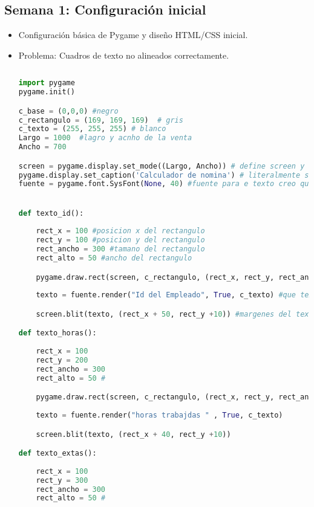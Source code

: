\documentclass[a4paper,12pt]{article}
\begin{document}
\subsection*{Semana 1: Configuración inicial}
\begin{itemize}
    \item Configuración básica de Pygame y diseño HTML/CSS inicial.
    \item Problema: Cuadros de texto no alineados correctamente.
    \begin{lstlisting}[language=Python]
    
import pygame
pygame.init()

c_base = (0,0,0) #negro
c_rectangulo = (169, 169, 169)  # gris
c_texto = (255, 255, 255) # blanco
Largo = 1000  #lagro y acnho de la venta
Ancho = 700

screen = pygame.display.set_mode((Largo, Ancho)) # define screen y ademas define el largo y anho de la ventana
pygame.display.set_caption('Calculador de nomina') # literalmente solo nombra la ventaa xd\
fuente = pygame.font.SysFont(None, 40) #fuente para e texto creo que es arial segun reddit no lo es pero no onfio en esos locos]


def texto_id():
    
    rect_x = 100 #posicion x del rectangulo
    rect_y = 100 #posicion y del rectangulo
    rect_ancho = 300 #tamano del rectangulo
    rect_alto = 50 #ancho del rectangulo

    pygame.draw.rect(screen, c_rectangulo, (rect_x, rect_y, rect_ancho, rect_alto)) #literalmente solo dibuje
    
    texto = fuente.render("Id del Empleado", True, c_texto) #que texto quiero que salga en el recatangulo

    screen.blit(texto, (rect_x + 50, rect_y +10)) #margenes del texto

def texto_horas():
    
    rect_x = 100 
    rect_y = 200 
    rect_ancho = 300 
    rect_alto = 50 #

    pygame.draw.rect(screen, c_rectangulo, (rect_x, rect_y, rect_ancho, rect_alto)) 
    
    texto = fuente.render("horas trabajdas " , True, c_texto) 

    screen.blit(texto, (rect_x + 40, rect_y +10)) 

def texto_extas():
    
    rect_x = 100 
    rect_y = 300 
    rect_ancho = 300 
    rect_alto = 50 #


\end{lstlisting}
\end{itemize}
\end{document}
